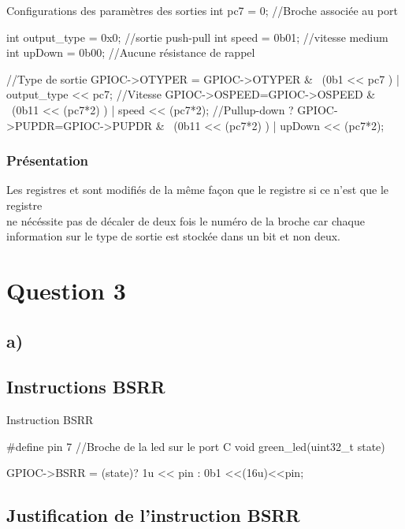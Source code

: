  \begin{Cpp}{Configurations des paramètres des sorties}
  int pc7 = 0;   //Broche associée au port
  
  int output_type = 0x0;   //sortie push-pull
  int speed = 0b01;        //vitesse medium
  int upDown = 0b00;       //Aucune résistance de rappel

  //Type de sortie
  GPIOC->OTYPER = GPIOC->OTYPER & ~(0b1 << pc7 ) | output_type << pc7; 
  //Vitesse
  GPIOC->OSPEED=GPIOC->OSPEED & ~(0b11 << (pc7*2) ) | speed << (pc7*2);
  //Pullup-down ?
  GPIOC->PUPDR=GPIOC->PUPDR & ~(0b11 << (pc7*2) ) | upDown << (pc7*2);

\end{Cpp}

\subsubsection{Présentation}

Les registres  et  sont modifiés de la même façon que le registre   si ce n'est que le registre \\
 ne nécéssite pas de décaler de deux fois le numéro de la broche car chaque information sur le type de sortie est stockée dans un bit et non deux.


\section{Question 3}

\subsection{a)}

\subsection{Instructions BSRR}

\begin{Cpp}{Instruction BSRR}
  
  #define pin 7 //Broche de la led sur le port C
  void green_led(uint32_t state) {

    GPIOC->BSRR = (state)?  1u << pin  :  0b1 <<(16u)<<pin;
    
  }
  

\end{Cpp}

\subsection{Justification de l'instruction BSRR}

